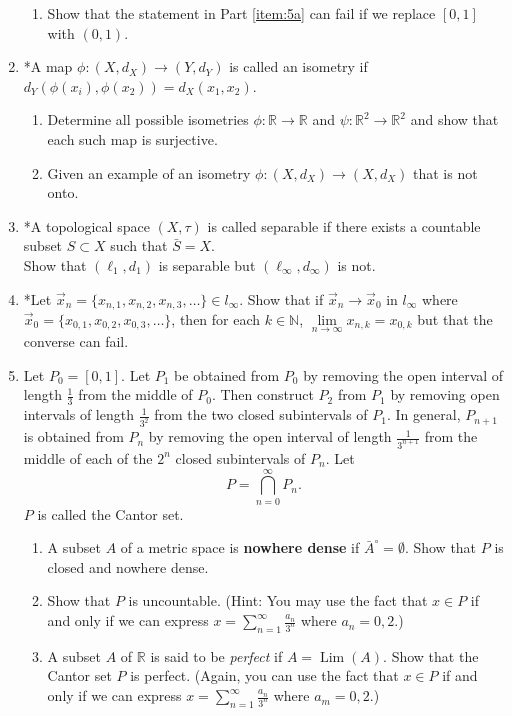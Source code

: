 \documentclass[notoc,notitlepage]{tufte-book}
\DeclareMathOperator{\Lim}{Lim }
\begin{document}
\begin{enumerate}
\begin{enumerate}
      \item Show that the statement in Part \ref{item:5a} can fail if we replace $[0, 1]$ with $(0, 1)$.
    \end{enumerate}

  \item *A map $\phi : (X, d_X) \to (Y, d_Y)$ is called an isometry if $d_Y(\phi(x_i), \phi(x_2)) = d_X(x_1, x_2)$.
    \begin{enumerate}
      \item Determine all possible isometries $\phi : \mathbb{R} \to \mathbb{R}$ and $\psi : \mathbb{R}^2 \to \mathbb{R}^2$ and show that each such map is surjective.
      \item Given an example of an isometry $\phi : (X, d_X) \to (X, d_X)$ that is not onto.
    \end{enumerate}

  \item *A topological space $(X, \tau)$ is called separable if there exists a countable subset $S \subset X$ such that $\bar{S} = X$. \\
    Show that $(\ell_1, d_1)$ is separable but $(\ell_\infty, d_\infty)$ is not.

  \item *Let $\vec{x}_n = \{ x_{n, 1}, x_{n, 2}, x_{n, 3}, \ldots \} \in l_\infty$. Show that if $\vec{x}_n \to \vec{x}_0$ in $l_\infty$ where $\vec{x}_0 = \{ x_{0, 1}, x_{0, 2}, x_{0, 3}, \ldots \}$, then for each $k \in \mathbb{N}$, $\lim\limits_{n \to \infty} x_{n, k} = x_{0, k}$ but that the converse can fail.

  \item Let $P_0 = [0, 1]$. Let $P_1$ be obtained from $P_0$ by removing the open interval of length $\frac{1}{3}$ from the middle of $P_0$. Then construct $P_2$ from $P_1$ by removing open intervals of length $\frac{1}{3^2}$ from the two closed subintervals of $P_1$. In general, $P_{n + 1}$ is obtained from $P_n$ by removing the open interval of length $\frac{1}{3^{n + 1}}$ from the middle of each of the $2^n$ closed subintervals of $P_n$. Let
    \begin{equation*}
      P = \bigcap_{n = 0}^{\infty} P_n.
    \end{equation*}
    $P$ is called the Cantor set.
    \begin{enumerate}
      \item A subset $A$ of a metric space is \textbf{nowhere dense} if $\bar{A}^\circ = \emptyset$. Show that $P$ is closed and nowhere dense.
      \item Show that $P$ is uncountable. (Hint: You may use the fact that $x \in P$ if and only if we can express $x = \sum\limits_{n=1}^{\infty} \frac{a_n}{3^n}$ where $a_n = 0, 2$.)
      \item A subset $A$ of $\mathbb{R}$ is said to be \textit{perfect} if $A = \Lim(A)$. Show that the Cantor set $P$ is perfect. (Again, you can use the fact that $x \in P$ if and only if we can express $x = \sum\limits_{n=1}^{\infty} \frac{a_n}{3^n}$ where $a_m = 0, 2$.)
    \end{enumerate}
\end{enumerate}
\end{document}
